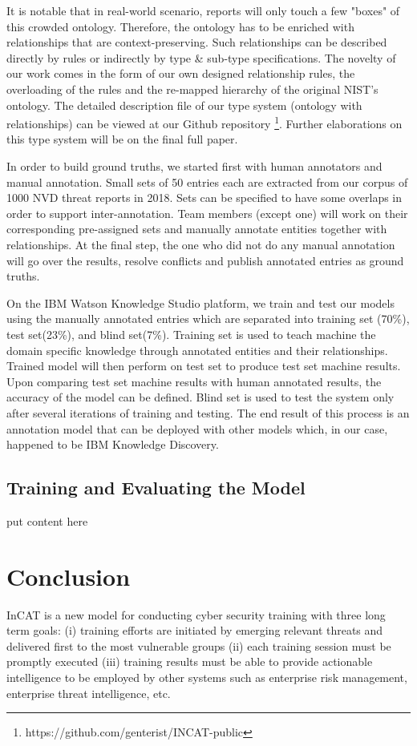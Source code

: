 \documentclass{article} %
\begin{document}
It is notable that in real-world scenario, reports will only touch a few "boxes" of this crowded ontology. Therefore, the ontology has to be enriched with relationships that are context-preserving. Such relationships can be described directly by rules or indirectly by type \& sub-type specifications. The novelty of our work comes in the form of our own designed relationship rules, the overloading of the rules and the re-mapped hierarchy of the original NIST's ontology. The detailed description file of our type system (ontology with relationships) can be viewed at our Github repository \footnote{https://github.com/genterist/INCAT-public}. Further elaborations on this type system will be on the final full paper.

In order to build ground truths, we started first with human annotators and manual annotation. Small sets of 50 entries each are extracted from our corpus of 1000 NVD threat reports in 2018. Sets can be specified to have some overlaps in order to support inter-annotation. Team members (except one) will work on their corresponding pre-assigned sets and manually annotate entities together with relationships. At the final step, the one who did not do any manual annotation will go over the results, resolve conflicts and publish annotated entries as ground truths.

On the IBM Watson Knowledge Studio platform, we train and test our models using the manually annotated entries which are separated into training set (70\%), test set(23\%), and blind set(7\%). Training set is used to teach machine the domain specific knowledge through annotated entities and their relationships. Trained model will then perform on test set to produce test set machine results. Upon comparing test set machine results with human annotated results, the accuracy of the model can be defined. Blind set is used to test the system only after several iterations of training and testing. The end result of this process is an annotation model that can be deployed with other models which, in our case, happened to be IBM Knowledge Discovery.

\subsection{Training and Evaluating the Model}
put content here

\section{Conclusion}
InCAT is a new model for conducting cyber security training with three long term goals: (i) training efforts are initiated by emerging relevant threats and delivered first to the most vulnerable groups (ii) each training session must be promptly executed (iii) training results must be able to provide actionable intelligence to be employed by other systems such as enterprise risk management, enterprise threat intelligence, etc.
\end{document}
